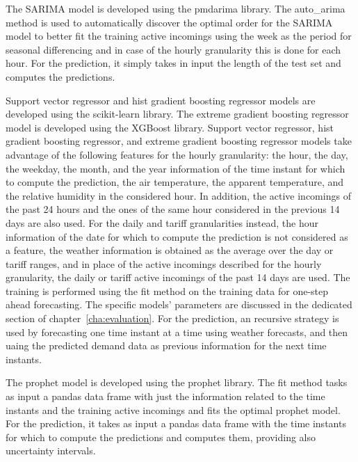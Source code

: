 The SARIMA model is developed using the pmdarima library.
The auto\_arima method is used to automatically discover the optimal order for the SARIMA model to better fit the training active incomings using the week as the period for seasonal differencing and in case of the hourly granularity this is done for each hour.
For the prediction, it simply takes in input the length of the test set and computes the predictions.

Support vector regressor and hist gradient boosting regressor models are developed using the scikit-learn library.
The extreme gradient boosting regressor model is developed using the XGBoost library.
Support vector regressor, hist gradient boosting regressor, and extreme gradient boosting regressor models take advantage of the following features for the hourly granularity: the hour, the day, the weekday, the month, and the year information of the time instant for which to compute the prediction, the air temperature, the apparent temperature, and the relative humidity in the considered hour.
In addition, the active incomings of the past 24 hours and the ones of the same hour considered in the previous 14 days are also used.
For the daily and tariff granularities instead, the hour information of the date for which to compute the prediction is not considered as a feature, the weather information is obtained as the average over the day or tariff ranges, and in place of the active incomings described for the hourly granularity, the daily or tariff active incomings of the past 14 days are used.
The training is performed using the fit method on the training data for one-step ahead forecasting.
The specific models’ parameters are discussed in the dedicated section of chapter~\ref{cha:evaluation}.
For the prediction, an recursive strategy is used by forecasting one time instant at a time using weather forecasts, and then uaing the predicted demand data as previous information for the next time instants.

The prophet model is developed using the prophet library.
The fit method tasks as input a pandas data frame with just the information related to the time instants and the training active incomings and fits the optimal prophet model.
For the prediction, it takes as input a pandas data frame with the time instants for which to compute the predictions and computes them, providing also uncertainty intervals.

